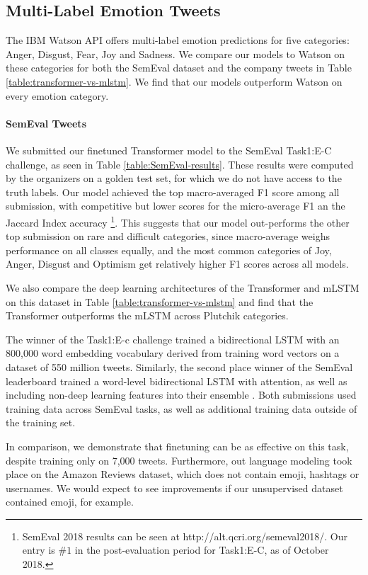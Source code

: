 \documentclass[letterpaper]{article} %
\begin{document}
\subsection{Multi-Label Emotion Tweets}
The IBM Watson API offers multi-label emotion predictions for five categories: Anger, Disgust, Fear, Joy and Sadness. We compare our models to Watson on these categories for both the SemEval dataset and the company tweets in Table \ref{table:transformer-vs-mlstm}. We find that our models outperform Watson on every emotion category. 

\paragraph{SemEval Tweets}
We submitted our finetuned Transformer model to the SemEval Task1:E-C challenge, as seen in Table \ref{table:SemEval-results}. These results were computed by the organizers on a golden test set, for which we do not have access to the truth labels. Our model achieved the top macro-averaged F1 score among all submission, with competitive but lower scores for the micro-average F1 an the Jaccard Index accuracy \footnote{SemEval 2018 results can be seen at 
http://alt.qcri.org/semeval2018/. Our entry is $\#1$ in the post-evaluation period for Task1:E-C, as of October 2018.}. This suggests that our model out-performs the other top submission on rare and difficult categories, since macro-average weighs performance on all classes equally, and the most common categories of Joy, Anger, Disgust and Optimism get relatively higher F1 scores across all models. 

We also compare the deep learning architectures of the Transformer and mLSTM on this dataset in Table \ref{table:transformer-vs-mlstm} and find that the Transformer outperforms the mLSTM across Plutchik categories.

The winner of the Task1:E-c challenge \cite{WinnerSemEval2018Task1} trained a bidirectional LSTM with an 800,000 word embedding vocabulary derived from training word vectors \cite{Mikolov2013} on a dataset of 550 million tweets. Similarly, the second place winner of the SemEval leaderboard trained a word-level bidirectional LSTM with attention, as well as including non-deep learning features into their ensemble \cite{ThirdPlaceSemEval2018Task1}. Both submissions used training data across SemEval tasks, as well as additional training data outside of the training set.

In comparison, we demonstrate that finetuning can be as effective on this task, despite training only on 7,000 tweets. Furthermore, out language modeling took place on the Amazon Reviews dataset, which does not contain emoji, hashtags or usernames. We would expect to see improvements if our unsupervised dataset contained emoji, for example.
\end{document}
